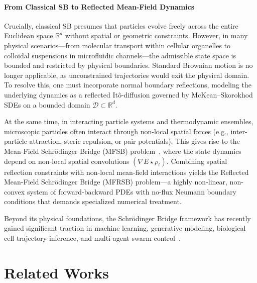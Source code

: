 \documentclass[10pt,a4paper]{article}
\begin{document}
\paragraph{From Classical SB to Reflected Mean-Field Dynamics}

Crucially, classical SB presumes that particles evolve freely across the entire Euclidean space $\mathbb{R}^d$ without spatial or geometric constraints. However, in many physical scenarios—from molecular transport within cellular organelles to colloidal suspensions in microfluidic channels—the admissible state space is bounded and restricted by physical boundaries. Standard Brownian motion is no longer applicable, as unconstrained trajectories would exit the physical domain. To resolve this, one must incorporate normal boundary reflections, modeling the underlying dynamics as a reflected Itô-diffusion governed by McKean--Skorokhod SDEs on a bounded domain $\mathcal{D} \subset \mathbb{R}^d$.

At the same time, in interacting particle systems and thermodynamic ensembles, microscopic particles often interact through non-local spatial forces (e.g., inter-particle attraction, steric repulsion, or pair potentials). This gives rise to the Mean-Field Schrödinger Bridge (MFSB) problem~\cite{meanfield_Benamou2019EntropyMFG, meanfield_Backhoff2020}, where the state dynamics depend on non-local spatial convolutions $(\nabla E \star \rho_t)$. Combining spatial reflection constraints with non-local mean-field interactions yields the Reflected Mean-Field Schrödinger Bridge (MFRSB) problem—a highly non-linear, non-convex system of forward-backward PDEs with no-flux Neumann boundary conditions that demands specialized numerical treatment.

Beyond its physical foundations, the Schrödinger Bridge framework has recently gained significant traction in machine learning, generative modeling, biological cell trajectory inference, and multi-agent swarm control~\cite{zhang2025modeling, gushchin2024light, wang2021deep}.
\section{Related Works}
\end{document}
